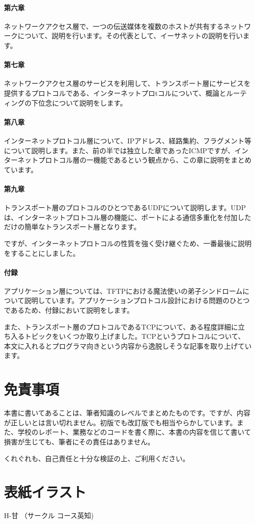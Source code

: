 \paragraph{第六章}
ネットワークアクセス層で、一つの伝送媒体を複数のホストが共有するネットワークについて、説明を行います。その代表として、イーサネットの説明を行います。

\paragraph{第七章}
ネットワークアクセス層のサービスを利用して、トランスポート層にサービスを提供するプロトコルである、インターネットプロtコルについて、概論とルーティングの下位念について説明をします。

\paragraph{第八章}
インターネットプロトコル層について、IPアドレス、経路集約、フラグメント等について説明します。また、前の半では独立した章であったICMPですが、インターネットプロトコル層の一機能であるという観点から、この章に説明をまとめています。

\paragraph{第九章}
トランスポート層のプロトコルのひとつであるUDPについて説明します。UDPは、インターネットプロトコル層の機能に、ポートによる通信多重化を付加しただけの簡単なトランスポート層となります。

ですが、インターネットプロトコルの性質を強く受け継ぐため、一番最後に説明をすることにしました。


\paragraph{付録}
アプリケーション層については、TFTPにおける魔法使いの弟子シンドロームについて説明しています。アプリケーションプロトコル設計における問題のひとつであるため、付録において説明をします。

また、トランスポート層のプロトコルであるTCPについて、ある程度詳細に立ち入るトピックをいくつか取り上げました。TCPというプロトコルについて、本文に入れるとプログラマ向きという内容から逸脱しそうな記事を取り上げています。

\section*{免責事項}
本書に書いてあることは、筆者知識のレベルでまとめたものです。ですが、内容が正しいとは言い切れません。初版でも改訂版でも相当やらかしています。また、学校のレポート、業務などのコードを書く際に、本書の内容を信じて書いて損害が生じても、筆者にその責任はありません。

くれぐれも、自己責任と十分な検証の上、ご利用ください。

\section*{表紙イラスト}
H-甘 （サークル コース英知)
